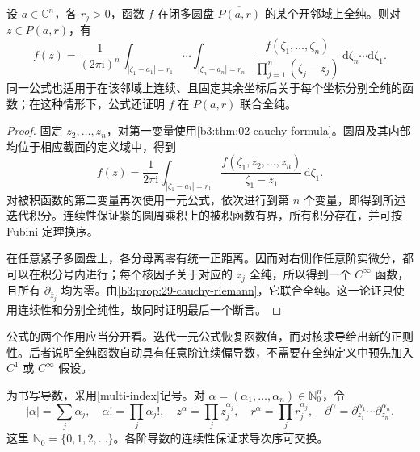 \begin{theorem}\label{b3:thm:29-polydisc-cauchy}
设 \(a\in\mathbb C^n\)，各 \(r_j>0\)，函数 \(f\) 在闭多圆盘 \(\overline{P(a,r)}\) 的某个开邻域上全纯。则对 \(z\in P(a,r)\)，有
\[
 f(z)=\frac1{(2\pi\mathrm{i})^n}
 \int_{|\zeta_1-a_1|=r_1}\!\cdots\!
 \int_{|\zeta_n-a_n|=r_n}
 \frac{f(\zeta_1,\ldots,\zeta_n)}
      {\prod_{j=1}^n(\zeta_j-z_j)}
 \,\mathrm{d}\zeta_n\cdots\mathrm{d}\zeta_1.
\]
同一公式也适用于在该邻域上连续、且固定其余坐标后关于每个坐标分别全纯的函数；在这种情形下，公式还证明 \(f\) 在 \(P(a,r)\) 联合全纯。
\end{theorem}
\begin{proof}
固定 \(z_2,\ldots,z_n\)，对第一变量使用\cref{b3:thm:02-cauchy-formula}。圆周及其内部均位于相应截面的定义域中，得到
\[
 f(z)=\frac1{2\pi\mathrm{i}}\int_{|\zeta_1-a_1|=r_1}
 \frac{f(\zeta_1,z_2,\ldots,z_n)}{\zeta_1-z_1}\,\mathrm{d}\zeta_1.
\]
对被积函数的第二变量再次使用一元公式，依次进行到第 \(n\) 个变量，即得到所述迭代积分。连续性保证紧的圆周乘积上的被积函数有界，所有积分存在，并可按 Fubini 定理换序。

在任意紧子多圆盘上，各分母离零有统一正距离。因而对右侧作任意阶实微分，都可以在积分号内进行；每个核因子关于对应的 \(z_j\) 全纯，所以得到一个 \(C^\infty\) 函数，且所有 \(\partial_{\bar z_j}\) 均为零。由\cref{b3:prop:29-cauchy-riemann}，它联合全纯。这一论证只使用连续性和分别全纯性，故同时证明最后一个断言。
\end{proof}

公式的两个作用应当分开看。迭代一元公式恢复函数值，而对核求导给出新的正则性。后者说明全纯函数自动具有任意阶连续偏导数，不需要在全纯定义中预先加入 \(C^1\) 或 \(C^\infty\) 假设。

\ProseParagraphBreak
为书写导数，采用[multi-index]记号。对 \(\alpha=(\alpha_1,\ldots,\alpha_n)\in\mathbb N_0^n\)，令
\[
 |\alpha|=\sum_j\alpha_j,\quad
 \alpha!=\prod_j\alpha_j!,\quad
 z^\alpha=\prod_jz_j^{\alpha_j},\quad
 r^\alpha=\prod_jr_j^{\alpha_j},\quad
 \partial^\alpha=\partial_{z_1}^{\alpha_1}\cdots\partial_{z_n}^{\alpha_n}.
\]
这里 \(\mathbb N_0=\{0,1,2,\ldots\}\)。各阶导数的连续性保证求导次序可交换。

